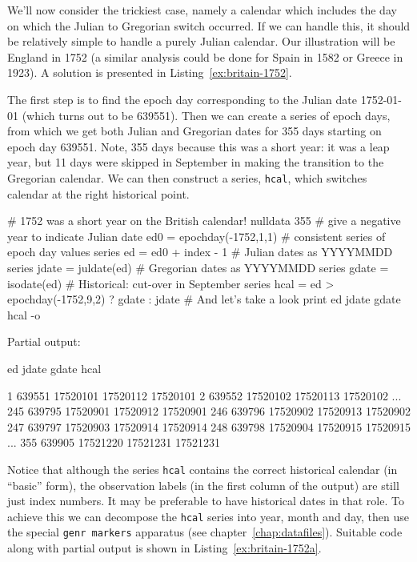 We'll now consider the trickiest case, namely a calendar which includes
the day on which the Julian to Gregorian switch occurred. If we can
handle this, it should be relatively simple to handle a purely Julian
calendar. Our illustration will be England in 1752 (a similar analysis
could be done for Spain in 1582 or Greece in 1923). A solution
is presented in Listing~\ref{ex:britain-1752}.

The first step is to find the epoch day corresponding to the Julian
date 1752-01-01 (which turns out to be 639551). Then we can create a
series of epoch days, from which we get both Julian and Gregorian
dates for 355 days starting on epoch day 639551. Note, 355 days
because this was a short year: it was a leap year, but 11 days were
skipped in September in making the transition to the Gregorian
calendar. We can then construct a series, \texttt{hcal}, which
switches calendar at the right historical point.

\begin{script}[htbp]
  \label{ex:britain-1752}
\begin{scodebit}
# 1752 was a short year on the British calendar!
nulldata 355
# give a negative year to indicate Julian date
ed0 = epochday(-1752,1,1)
# consistent series of epoch day values
series ed = ed0 + index - 1
# Julian dates as YYYYMMDD
series jdate = juldate(ed)
# Gregorian dates as YYYYMMDD
series gdate = isodate(ed)
# Historical: cut-over in September
series hcal = ed > epochday(-1752,9,2) ? gdate : jdate
# And let's take a look
print ed jdate gdate hcal -o
\end{scodebit}
  
Partial output:
\begin{outbit}
              ed        jdate        gdate         hcal

  1       639551     17520101     17520112     17520101
  2       639552     17520102     17520113     17520102
...
245       639795     17520901     17520912     17520901
246       639796     17520902     17520913     17520902
247       639797     17520903     17520914     17520914
248       639798     17520904     17520915     17520915
...
355       639905     17521220     17521231     17521231
\end{outbit}
\end{script}

Notice that although the series \texttt{hcal} contains the correct
historical calendar (in ``basic'' form), the observation labels (in
the first column of the output) are still just index numbers. It may
be preferable to have historical dates in that role. To achieve this
we can decompose the \texttt{hcal} series into year, month and day,
then use the special \texttt{genr markers} apparatus (see
chapter~\ref{chap:datafiles}). Suitable code along with partial output
is shown in Listing~\ref{ex:britain-1752a}.

